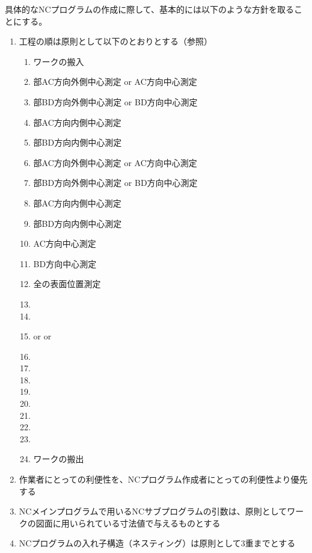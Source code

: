\clearpage
具体的なNCプログラムの作成に際して、基本的には以下のような方針を取ることにする。
\begin{enumerate}[label*=\alph*)]
\item 工程の順は原則として以下のとおりとする（参照）
  \begin{enumerate}[label={\arabic*.}]
  \item ワークの搬入
  \item \BottomEndFace 部AC方向外側中心測定 or \BottomOutcut AC方向中心測定
  \item \BottomEndFace 部BD方向外側中心測定 or \BottomOutcut BD方向中心測定
  \item \BottomEndFace 部AC方向内側中心測定
  \item \BottomEndFace 部BD方向内側中心測定
  \item \TopEndFace 部AC方向外側中心測定 or \TopOutcut AC方向中心測定
  \item \TopEndFace 部BD方向外側中心測定 or \TopOutcut BD方向中心測定
  \item \TopEndFace 部AC方向内側中心測定
  \item \TopEndFace 部BD方向内側中心測定
  \item \Keyway AC方向中心測定
  \item \Keyway BD方向中心測定
  \item 全\Dimple の表面位置測定
  \item \DimpleMilling
  \item \TopEndFacecutMilling
  \item \TopOutcutMilling or \EndFaceBoringMilling or \IncutBoringMilling
  \item \KeywayMilling
  \item \TopEndFaceOutCChamferMilling
  \item \TopEndFaceInCChamferMilling
  \item \BottomEndFacecutMilling
  \item \BottomOutcutMilling
  \item \BottomEndFaceOutCChamferMilling
  \item \BottomEndFaceInCChamferMilling
  \item \CenterlineEndFaceDifMeasurement
  \item ワークの搬出
  \end{enumerate}
\item 作業者にとっての利便性を、NCプログラム作成者にとっての利便性より優先する
\item {}NCメインプログラムで用いるNCサブプログラムの引数は、原則としてワークの図面に用いられている寸法値で与えるものとする
\item NCプログラムの入れ子構造（ネスティング）は原則として3重までとする
\end{enumerate}


